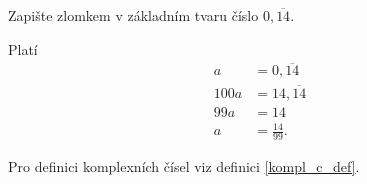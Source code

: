 \begin{priklad}
    Zapište zlomkem v základním tvaru číslo $0,\overline{14}.$
\end{priklad}

\begin{reseni}
    Platí
    \begin{align*}
        a&=0,\overline{14}\\
        100a &= 14,\overline{14} \\
        99a &= 14\\
        a &= \frac{14}{99}.
    \end{align*}
\end{reseni}


\begin{pozn}
    Pro definici komplexních čísel viz definici \ref{kompl_c_def}.
\end{pozn}

